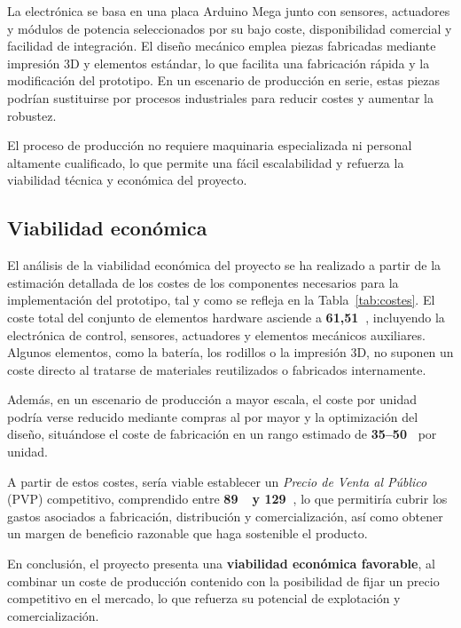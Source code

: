 La electrónica se basa en una placa Arduino Mega junto con sensores, actuadores y módulos de potencia seleccionados por su bajo coste, disponibilidad comercial y facilidad de integración. El diseño mecánico emplea piezas fabricadas mediante impresión 3D y elementos estándar, lo que facilita una fabricación rápida y la modificación del prototipo. En un escenario de producción en serie, estas piezas podrían sustituirse por procesos industriales para reducir costes y aumentar la robustez.

El proceso de producción no requiere maquinaria especializada ni personal altamente cualificado, lo que permite una fácil escalabilidad y refuerza la viabilidad técnica y económica del proyecto.

\subsection{Viabilidad económica}
El análisis de la viabilidad económica del proyecto se ha realizado a partir de la estimación detallada de los costes de los componentes necesarios para la implementación del prototipo, tal y como se refleja en la Tabla~\ref{tab:costes}. El coste total del conjunto de elementos hardware asciende a \textbf{61,51~\texteuro}, incluyendo la electrónica de control, sensores, actuadores y elementos mecánicos auxiliares. Algunos elementos, como la batería, los rodillos o la impresión 3D, no suponen un coste directo al tratarse de materiales reutilizados o fabricados internamente.

Además, en un escenario de producción a mayor escala, el coste por unidad podría verse reducido mediante compras al por mayor y la optimización del diseño, situándose el coste de fabricación en un rango estimado de \textbf{35--50~\texteuro} por unidad.

A partir de estos costes, sería viable establecer un \textit{Precio de Venta al Público} (PVP) competitivo, comprendido entre \textbf{89~\texteuro\ y 129~\texteuro}, lo que permitiría cubrir los gastos asociados a fabricación, distribución y comercialización, así como obtener un margen de beneficio razonable que haga sostenible el producto.

En conclusión, el proyecto presenta una \textbf{viabilidad económica favorable}, al combinar un coste de producción contenido con la posibilidad de fijar un precio competitivo en el mercado, lo que refuerza su potencial de explotación y comercialización.
